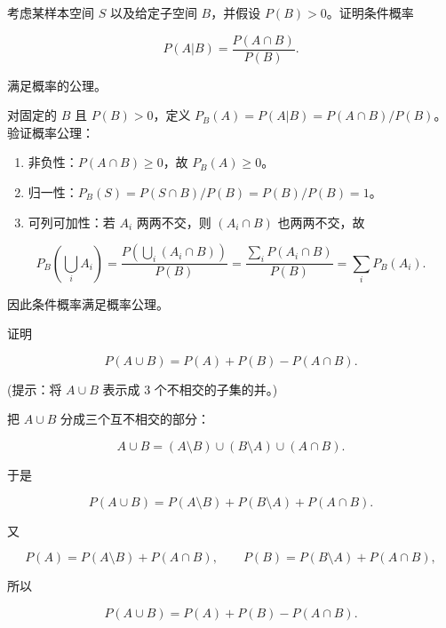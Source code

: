 ﻿


\begin{question}
考虑某样本空间 \(S\) 以及给定子空间 \(B\)，并假设 \(P(B)>0\)。证明条件概率

\[
P(A|B)=\frac{P(A\cap B)}{P(B)}.
\]

满足概率的公理。
\begin{solution}
对固定的 \(B\) 且 \(P(B)>0\)，定义
\(P_B(A)=P(A|B)=P(A\cap B)/P(B)\)。验证概率公理：

\begin{enumerate}
\item
  非负性：\(P(A\cap B)\ge0\)，故 \(P_B(A)\ge0\)。
\item
  归一性：\(P_B(S)=P(S\cap B)/P(B)=P(B)/P(B)=1\)。
\item
  可列可加性：若 \(A_i\) 两两不交，则 \((A_i\cap B)\) 也两两不交，故
\end{enumerate}

\[
P_B\left(\bigcup_i A_i\right)=\frac{P\left(\bigcup_i(A_i\cap B)\right)}{P(B)}
=\frac{\sum_iP(A_i\cap B)}{P(B)}=\sum_iP_B(A_i).
\]

因此条件概率满足概率公理。
\end{solution}
\end{question}


\begin{question}
证明

\[
P(A\cup B)=P(A)+P(B)-P(A\cap B).
\]

(提示：将 \(A\cup B\) 表示成 3 个不相交的子集的并。)
\begin{solution}
把 \(A\cup B\) 分成三个互不相交的部分：

\[
A\cup B=(A\setminus B)\cup(B\setminus A)\cup(A\cap B).
\]

于是

\[
P(A\cup B)=P(A\setminus B)+P(B\setminus A)+P(A\cap B).
\]

又

\[
P(A)=P(A\setminus B)+P(A\cap B),\qquad
P(B)=P(B\setminus A)+P(A\cap B),
\]

所以

\[
P(A\cup B)=P(A)+P(B)-P(A\cap B).
\]
\end{solution}
\end{question}



